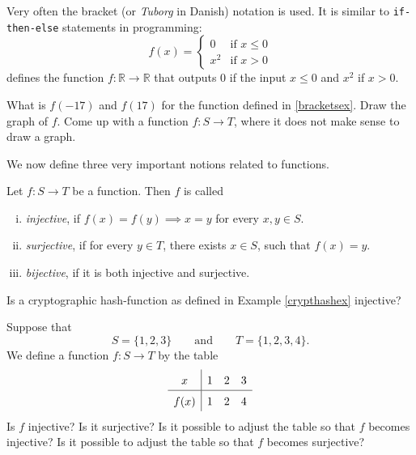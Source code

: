 Very often the bracket (or \emph{Tuborg} in Danish) notation is used. It is
similar to \texttt{if-then-else} statements in programming:
\begin{equation}\label{bracketsex}
  f(x) =
  \begin{cases}
    0   & \text{if } x\leq 0 \\
    x^2 & \text{if } x > 0
  \end{cases}
\end{equation}
defines the function $f:\mathbb{R} \rightarrow \mathbb{R}$ that outputs $0$ if the
input $x\leq 0$ and $x^2$ if $x>0$.

\begin{exercise}
  What is $f(-17)$ and $f(17)$ for the function defined in \eqref{bracketsex}. Draw
  the graph of $f$. Come up with a function $f:S\rightarrow T$, where it
  does not make sense to draw a graph.
\end{exercise}

We now define three very important notions related to functions.

\begin{tcolorbox}\begin{definition}
    Let $f: S\rightarrow T$ be a function. Then $f$ is called
    \begin{enumerate}[(i)]
      \item
            \emph{injective}, if $f(x) = f(y) \implies x = y$ for every $x, y\in S$.
      \item
            \emph{surjective}, if for every $y\in T$, there exists $x\in S$, such that $f(x) = y$.
      \item
            \emph{bijective}, if it is both injective and surjective.
    \end{enumerate}
  \end{definition}\end{tcolorbox}

\begin{exercise}
  Is a cryptographic hash-function as defined in Example \ref{crypthashex} injective?
\end{exercise}

\begin{exercise}
  Suppose that
  $$
    S = \{1, 2, 3\}\qquad\text{and}\qquad T = \{1, 2, 3, 4\}.
  $$
  We define a function $f: S\rightarrow T$ by the table
  $$
    \def\arraystretch{1.5}
    \begin{array}{c|ccccccc}
      x    & 1 & 2 & 3 \\ \hline
      f(x) & 1 & 2 & 4
    \end{array}
  $$
  Is $f$ injective? Is it surjective? Is it possible to adjust the table so that
  $f$ becomes injective?
  Is it possible to adjust the table so that
  $f$ becomes surjective?
\end{exercise}

